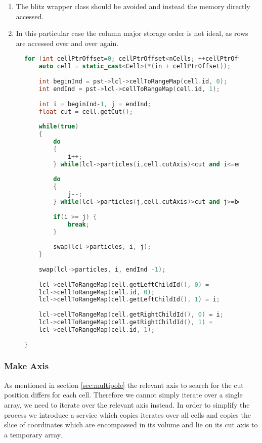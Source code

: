 \documentclass[]{article}
\begin{document}
\begin{enumerate}
	\item The blitz wrapper class should be avoided and instead the memory directly accessed.
	\item In this particular case the column major storage order is not ideal, as rows are accessed over and over again.
\end{enumerate}

\begin{figure}[H] 
	\begin{lstlisting}[language=c++, caption=Partition Service, label=partition]
for (int cellPtrOffset=0; cellPtrOffset<nCells; ++cellPtrOffset){
	auto cell = static_cast<Cell>(*(in + cellPtrOffset));
	
	int beginInd = pst->lcl->cellToRangeMap(cell.id, 0);
	int endInd = pst->lcl->cellToRangeMap(cell.id, 1);
	
	int i = beginInd-1, j = endInd;
	float cut = cell.getCut();
	
	while(true)
	{
		do
		{
			i++;
		} while(lcl->particles(i,cell.cutAxis)<cut and i<=endInd);
		
		do
		{
			j--;
		} while(lcl->particles(j,cell.cutAxis)>cut and j>=beginInd);
		
		if(i >= j) {
			break;
		}
		
		swap(lcl->particles, i, j);
	}
	
	swap(lcl->particles, i, endInd -1);
	
	lcl->cellToRangeMap(cell.getLeftChildId(), 0) =
	lcl->cellToRangeMap(cell.id, 0);
	lcl->cellToRangeMap(cell.getLeftChildId(), 1) = i;
	
	lcl->cellToRangeMap(cell.getRightChildId(), 0) = i;
	lcl->cellToRangeMap(cell.getRightChildId(), 1) =
	lcl->cellToRangeMap(cell.id, 1);
	
}
	\end{lstlisting}
\end{figure}


\subsubsection{Make Axis}

As mentioned in section \ref{sec:multipole} the relevant axis to search for the cut position differs for each cell. Therefore we cannot simply iterate over a single array, we need to iterate over the relevant axis instead. In order to simplify the process we introduce a service which copies iterates over all cells and copies the slice of coordinates which are encompassed in its volume and lie on its cut axis to a temporary array.
\end{document}
